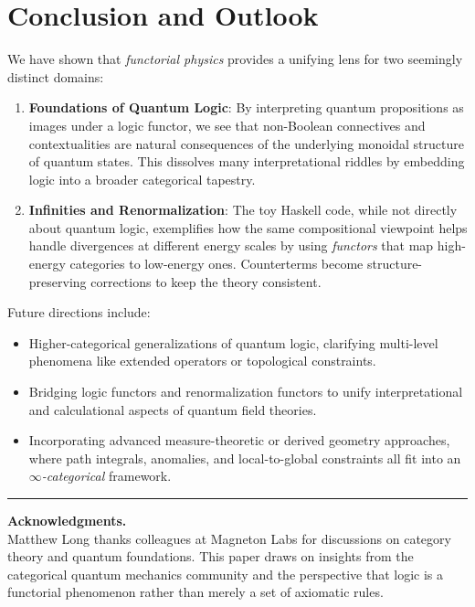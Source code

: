 \documentclass[12pt]{article}
\begin{document}
\section{Conclusion and Outlook}
We have shown that \emph{functorial physics} provides a unifying lens for two seemingly distinct domains:
\begin{enumerate}[label=\arabic*)]
    \item \textbf{Foundations of Quantum Logic}: By interpreting quantum propositions as images under a logic functor, 
    we see that non-Boolean connectives and contextualities are natural consequences of the underlying monoidal structure 
    of quantum states. This dissolves many interpretational riddles by embedding logic into a broader categorical tapestry.

    \item \textbf{Infinities and Renormalization}: The toy Haskell code, while not directly about quantum logic, 
    exemplifies how the same compositional viewpoint helps handle divergences at different energy scales by using 
    \emph{functors} that map high-energy categories to low-energy ones. Counterterms become structure-preserving corrections 
    to keep the theory consistent.
\end{enumerate}

\noindent Future directions include:
\begin{itemize}[label=$\diamond$]
\item Higher-categorical generalizations of quantum logic, clarifying multi-level phenomena like extended operators or topological constraints.
\item Bridging logic functors and renormalization functors to unify interpretational and calculational aspects of quantum field theories.
\item Incorporating advanced measure-theoretic or derived geometry approaches, where path integrals, anomalies, and local-to-global constraints 
all fit into an \emph{$\infty$-categorical} framework.
\end{itemize}

\vspace{1em}
\hrule
\vspace{1em}

\noindent\textbf{Acknowledgments.} \\
Matthew Long thanks colleagues at Magneton Labs for discussions on category theory and quantum foundations. 
This paper draws on insights from the categorical quantum mechanics community and the perspective 
that logic is a functorial phenomenon rather than merely a set of axiomatic rules.
\end{document}
